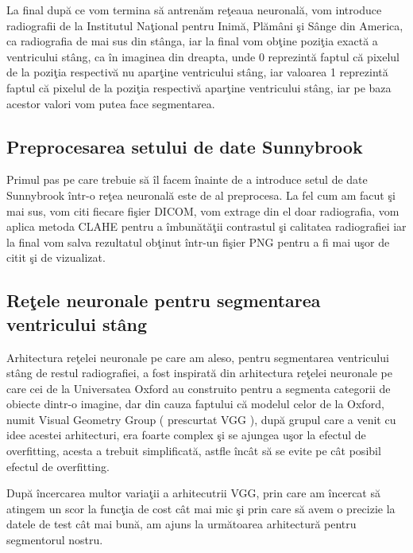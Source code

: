 \par

La final dup\u{a} ce vom termina s\u{a} antren\u{a}m re\c{t}eaua neuronal\u{a}, vom introduce radiografii de la Institutul Na\c{t}ional pentru Inim\u{a}, Pl\u{a}m\^{a}ni \c{s}i S\^{a}nge din America, ca radiografia de mai sus din st\^{a}nga, iar la final vom ob\c{t}ine pozi\c{t}ia exact\u{a} a ventricului st\^{a}ng, ca \^{i}n imaginea din dreapta, unde 0 reprezint\u{a} faptul c\u{a} pixelul de la pozi\c{t}ia respectiv\u{a} nu apar\c{t}ine ventricului st\^{a}ng, iar valoarea 1 reprezint\u{a} faptul c\u{a} pixelul de la pozi\c{t}ia respectiv\u{a} apar\c{t}ine ventricului st\^{a}ng, iar pe baza acestor valori vom putea face segmentarea.

\subsection{Preprocesarea setului de date Sunnybrook}

Primul pas pe care trebuie s\u{a} \^{i}l facem \^{i}nainte de a introduce setul de date Sunnybrook \^{i}ntr-o re\c{t}ea neuronal\u{a} este de al preprocesa. La fel cum am facut \c{s}i mai sus, vom citi fiecare fi\c{s}ier DICOM, vom extrage din el doar radiografia, vom aplica metoda CLAHE pentru a \^{i}mbun\u{a}t\u{a}\c{t}ii contrastul \c{s}i calitatea radiografiei iar la final vom salva rezultatul ob\c{t}inut \^{i}ntr-un fi\c{s}ier PNG pentru a fi mai u\c{s}or de citit \c{s}i de vizualizat.

\subsection{Re\c{t}ele neuronale pentru segmentarea ventricului st\^{a}ng}

Arhitectura re\c{t}elei neuronale pe care am aleso, pentru segmentarea ventricului st\^{a}ng de restul radiografiei, a fost inspirat\u{a} din arhitectura re\c{t}elei neuronale pe care cei de la Universatea Oxford au construito pentru a segmenta categorii de obiecte dintr-o imagine, dar din cauza faptului c\u{a} modelul celor de la Oxford, numit Visual Geometry Group ( prescurtat VGG ), dup\u{a} grupul care a venit cu idee acestei arhitecturi, era foarte complex \c{s}i se ajungea u\c{s}or la efectul de overfitting, acesta a trebuit simplificat\u{a,} astfle \^{i}nc\^{a}t s\u{a} se evite pe c\^{a}t posibil efectul de overfitting.

\par

Dup\u{a} \^{i}ncercarea multor varia\c{t}ii a arhitecutrii VGG, prin care am \^{i}ncercat s\u{a} atingem un scor la func\c{t}ia de cost c\^{a}t mai mic \c{s}i prin care s\u{a} avem o precizie la datele de test c\^{a}t mai bun\u{a}, am ajuns la urm\u{a}toarea arhitectur\u{a} pentru segmentorul nostru.


